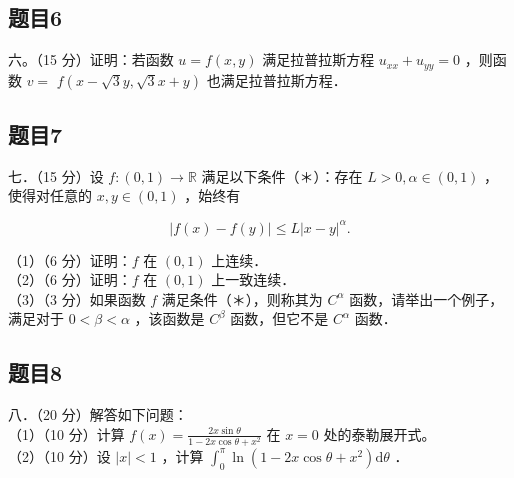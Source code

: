 \documentclass{article}
\begin{document}
\subsection{题目6}
六。（15 分）证明：若函数 \(u=f(x, y)\) 满足拉普拉斯方程 \(u_{x x}+u_{y y}=0\) ，则函数 \(v=\) \(f(x-\sqrt{3} y, \sqrt{3} x+y)\) 也满足拉普拉斯方程．

\subsection{题目7}
七．（15 分）设 \(f:(0,1) \rightarrow \mathbb{R}\) 满足以下条件（＊）：存在 \(L>0, \alpha \in(0,1)\) ，使得对任意的 \(x, y \in(0,1)\) ，始终有

\[
|f(x)-f(y)| \leq L|x-y|^{\alpha} .
\]

（1）（6 分）证明：\(f\) 在 \((0,1)\) 上连续．\\
（2）（6 分）证明：\(f\) 在 \((0,1)\) 上一致连续．\\
（3）（3 分）如果函数 \(f\) 满足条件（＊），则称其为 \(C^{\alpha}\) 函数，请举出一个例子，满足对于 \(0<\beta<\alpha\) ，该函数是 \(C^{\beta}\) 函数，但它不是 \(C^{\alpha}\) 函数．

\subsection{题目8}
八．（20 分）解答如下问题：\\
（1）（10 分）计算 \(f(x)=\frac{2 x \sin \theta}{1-2 x \cos \theta+x^{2}}\) 在 \(x=0\) 处的泰勒展开式。\\
（2）（10 分）设 \(|x|<1\) ，计算 \(\int_{0}^{\pi} \ln \left(1-2 x \cos \theta+x^{2}\right) \mathrm{d} \theta\) ．
\end{document}
